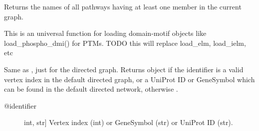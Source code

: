 \documentclass[letterpaper,10pt,english]{sphinxmanual}
\begin{document}
\begin{fulllineitems}

\begin{fulllineitems}
\label{\detokenize{main:pypath.main.PyPath.pathway_names}}
Returns the names of all pathways having at least one member
in the current graph.

\end{fulllineitems}


\begin{fulllineitems}
\label{\detokenize{main:pypath.main.PyPath.process_dmi}}
This is an universal function
for loading domain-motif objects
like load\_phospho\_dmi() for PTMs.
TODO this will replace load\_elm, load\_ielm, etc

\end{fulllineitems}


\begin{fulllineitems}
\label{\detokenize{main:pypath.main.PyPath.protein}}
Same as , just for the directed graph.
Returns  object if the identifier
is a valid vertex index in the default directed graph,
or a UniProt ID or GeneSymbol which can be found in the
default directed network, otherwise .
\begin{description}
\item[{@identifier}] \leavevmode{[}int, str{]}
Vertex index (int) or GeneSymbol (str) or UniProt ID (str).

\end{description}

\end{fulllineitems}



\end{fulllineitems}
\end{document}
